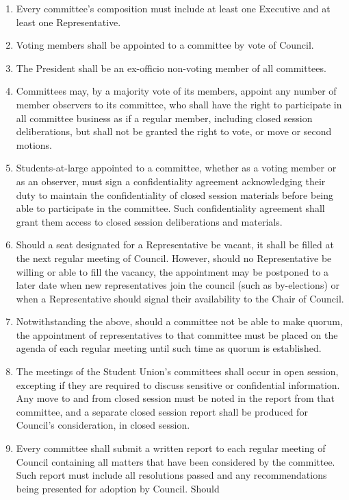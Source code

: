 \documentclass[oneside]{book}
\begin{document}
\begin{enumerate}
\item Every committee’s composition must include at least one Executive and at least one Representative. 
\item Voting members shall be appointed to a committee by vote of Council.
\item The President shall be an ex-officio non-voting member of all committees. 
\item Committees may, by a majority vote of its members, appoint any number of member observers to its committee, who shall have the right to participate in all committee business as if a regular member, including closed session deliberations, but shall not be granted the right to vote, or move or second motions.
\item \label{student_at_large_confidentiality_agreement} Students-at-large appointed to a committee, whether as a voting member or as an observer, must sign a confidentiality agreement acknowledging their duty to maintain the confidentiality of closed session materials before being able to participate in the committee. Such confidentiality agreement shall grant them access to closed session deliberations and materials. 
\item \label{committee-vacancy} Should a seat designated for a Representative be vacant, it shall be filled at the next regular
meeting of Council. However, should no Representative be willing or able to fill the vacancy, the appointment may be postponed to a 
later date when new representatives join the council (such as by-elections) or when a Representative 
should signal their availability to the Chair of Council.
\item Notwithstanding the above, should a committee not be able to make quorum, the appointment of 
representatives to that committee must be placed on the agenda of each regular meeting until such 
time as quorum is established.
\item The meetings of the Student Union’s committees shall occur in open session, excepting 
if they are required to discuss sensitive or confidential information. Any move to and from closed 
session must be noted in the report from that committee, and a separate closed session report shall 
be produced for Council’s consideration, in closed session.
\item \label{committee_reports} Every committee shall submit a written report to each regular meeting of Council containing all matters that have been considered
by the committee. Such report must include all resolutions passed and any recommendations being presented for adoption by Council. Should 

\end{enumerate}
\end{document}
